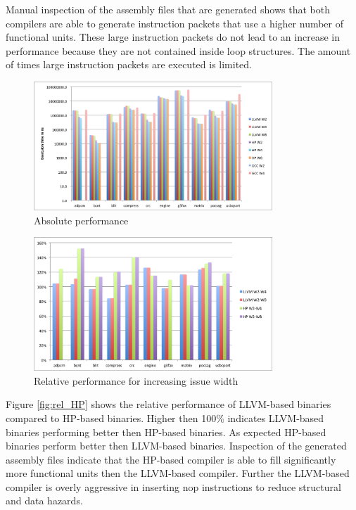 Manual inspection of the assembly files that are generated shows that both compilers are able to generate instruction packets that use a higher number of functional units. These large instruction packets do not lead to an increase in performance because they are not contained inside loop structures. The amount of times large instruction packets are executed is limited. 


\begin{figure}[ht]
\centering
\includegraphics[width=0.8\textwidth]{5_results/img/abs_perf.png}
\caption{Absolute performance}
\label{fig:abs_perf}
\end{figure}

\begin{figure}[ht]
\centering
\includegraphics[width=0.8\textwidth]{5_results/img/rel_issue.png}
\caption{Relative performance for increasing issue width}
\label{fig:rel_issue}
\end{figure}

Figure \ref{fig:rel_HP} shows the relative performance of LLVM-based binaries compared to HP-based binaries. Higher then 100\% indicates LLVM-based binaries performing better then HP-based binaries. As expected HP-based binaries perform better then LLVM-based binaries. Inspection of the generated assembly files indicate that the HP-based compiler is able to fill significantly more functional units then the LLVM-based compiler. Further the LLVM-based compiler is overly aggressive in inserting nop instructions to reduce structural and data hazards.


